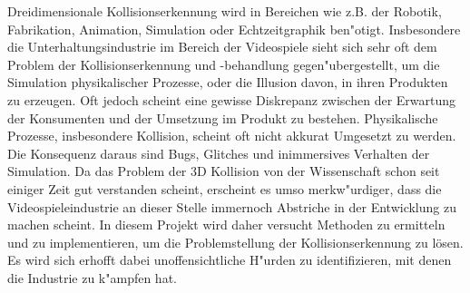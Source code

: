 
Dreidimensionale Kollisionserkennung wird in Bereichen wie z.B. der Robotik, Fabrikation, Animation, Simulation oder Echtzeitgraphik ben"otigt.
Insbesondere die Unterhaltungsindustrie im Bereich der Videospiele sieht sich sehr oft dem Problem der Kollisionserkennung und -behandlung gegen"ubergestellt, um die Simulation physikalischer Prozesse, oder die Illusion davon, in ihren Produkten zu erzeugen.
Oft jedoch scheint eine gewisse Diskrepanz zwischen der Erwartung der Konsumenten und der Umsetzung im Produkt zu bestehen. Physikalische Prozesse, insbesondere Kollision, scheint oft nicht akkurat Umgesetzt zu werden. Die Konsequenz daraus sind Bugs, Glitches und inimmersives Verhalten der Simulation.
Da das Problem der 3D Kollision von der Wissenschaft schon seit einiger Zeit gut verstanden scheint, erscheint es umso merkw"urdiger, dass die Videospieleindustrie an dieser Stelle immernoch Abstriche in der Entwicklung zu machen scheint.
In diesem Projekt wird daher versucht Methoden zu ermitteln und zu implementieren, um die Problemstellung der Kollisionserkennung zu lösen.
Es wird sich erhofft dabei unoffensichtliche H"urden zu identifizieren, mit denen die Industrie zu k"ampfen hat.
